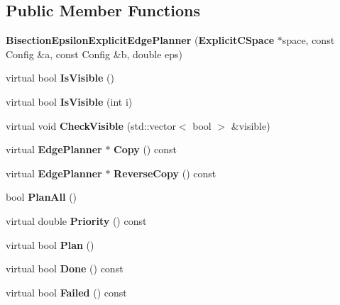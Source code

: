 \subsection*{Public Member Functions}
\begin{DoxyCompactItemize}
\item 
{\bfseries Bisection\+Epsilon\+Explicit\+Edge\+Planner} ({\bf Explicit\+C\+Space} $\ast$space, const Config \&a, const Config \&b, double eps)\label{classBisectionEpsilonExplicitEdgePlanner_a44bca5a38b91589f3784a3b88892b7ab}

\item 
virtual bool {\bfseries Is\+Visible} ()\label{classBisectionEpsilonExplicitEdgePlanner_ac2075897238afe2a282ba6a3354d0dd2}

\item 
virtual bool {\bfseries Is\+Visible} (int i)\label{classBisectionEpsilonExplicitEdgePlanner_ab69e84eaed85480afd1da44e33475c16}

\item 
virtual void {\bfseries Check\+Visible} (std\+::vector$<$ bool $>$ \&visible)\label{classBisectionEpsilonExplicitEdgePlanner_aefee540b3f2a47605e9b6a01f754a1d6}

\item 
virtual {\bf Edge\+Planner} $\ast$ {\bfseries Copy} () const \label{classBisectionEpsilonExplicitEdgePlanner_ae8e47b97c509edee78d9a2aa61f46476}

\item 
virtual {\bf Edge\+Planner} $\ast$ {\bfseries Reverse\+Copy} () const \label{classBisectionEpsilonExplicitEdgePlanner_a70d1c02b22510d7879543808d99b1aa6}

\item 
bool {\bfseries Plan\+All} ()\label{classBisectionEpsilonExplicitEdgePlanner_aad925f13f59865ff40a1e9598306d23b}

\item 
virtual double {\bfseries Priority} () const \label{classBisectionEpsilonExplicitEdgePlanner_a632d9cfab63a59469ceae16351fc43f6}

\item 
virtual bool {\bfseries Plan} ()\label{classBisectionEpsilonExplicitEdgePlanner_a2ad3e71f42507850a0c265535c8111ad}

\item 
virtual bool {\bfseries Done} () const \label{classBisectionEpsilonExplicitEdgePlanner_a76c4a169bf3262812ec81c0d67754454}

\item 
virtual bool {\bfseries Failed} () const \label{classBisectionEpsilonExplicitEdgePlanner_af3832c15aba3674ba4f247c9536c69d4}


\end{DoxyCompactItemize}
